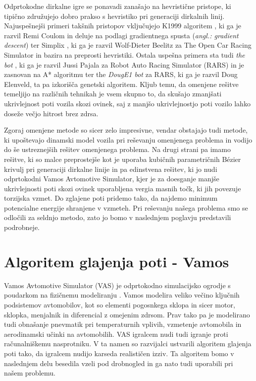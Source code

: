 \documentclass[final,5p,times,twocolumn]{elsarticle}
\begin{document}
Odprtokodne dirkalne igre se ponavadi zanašajo na hevristične pristope, ki tipično združujejo dobro prakso s hevristiko pri generaciji dirkalnih linij. Najuspešnejši primeri takšnih pristopov vključujejo K1999 algoritem \cite{coulom2002reinforcement}, ki ga je razvil Remi Coulom in deluje na podlagi gradientnega spusta (\textit{angl.: gradient descent}) ter Simplix \cite{Simplix}, ki ga je razvil Wolf-Dieter Beelitz za The Open Car Racing Simulator in bazira na preprosti hevristiki. Ostala uspešna primera sta tudi \textit{the bot} \cite{rars}, ki ga je razvil Jussi Pajala za Robot Auto Racing Simulator (RARS) in je zasnovan na A* algoritmu ter the \textit{DougE1 bot} za RARS, ki ga je razvil Doug Elenveld, ta pa izkorišča genetski algoritem. Kljub temu, da omenjene rešitve temeljijo na različnih tehnikah je vsem skupno to, da skušajo zmanjšati ukrivlejnost poti vozila skozi ovinek, saj z manjšo ukrivlejnostjo poti vozilo lahko doseže večjo hitrost brez zdrsa.

Zgoraj omenjene metode so sicer zelo impresivne, vendar obstajajo tudi metode, ki upoštevajo dinamski model vozila pri reševanju omenjenega problema in vodijo do še ustreznejših rešitev omenjenega problema. Na drugi strani pa imamo rešitve, ki so malce preprostejše kot je uporaba kubičnih parametričnih Bézier krivulj pri generaciji dirkalne linije \cite{botta2012evolving} in pa edinstvena rešitev, ki jo nudi odprtokodni Vamos Avtomotive Simulator, kjer je za doesganje manjše ukrivlejnosti poti skozi ovinek uporabljena vergia masnih točk, ki jih povezuje torzijska vzmet. Do zglajene poti pridemo tako, da najdemo minimum potencialne energije shranjene v vzmeteh. Pri reševanju našega problema smo se odločili za seldnjo metodo, zato jo bomo v naslednjem poglavju predstavili podrobneje.

\section{Algoritem glajenja poti - Vamos}

Vamos Avtomotive Simulator (VAS) je odprtokodno simulacijsko ogrodje s poudarkom na fizičnemu modeliranju \cite{VAS}. Vamos modelira veliko večino ključnih podsistemov avtomobilov, kot so elementi pogosnkega sklopa in sicer motor, sklopka, menjalnik in diferencial z omejenim zdrsom. Prav tako pa je modelirano tudi obnašanje pnevmatik pri temperaturnih vplivih, vzmetenje avtomobila in aerodinamski učinki na avtomobilih. VAS igralcem nudi tudi igranje proti računalniškemu nasprotniku. V ta namen so razvijalci ustvarili algoritem glajenja poti tako, da igralcem nudijo karseda realističen izziv. Ta algoritem bomo v naslednjem delu besedila vzeli pod drobnogled in ga nato tudi uporabili pri našem problemu.
\end{document}
